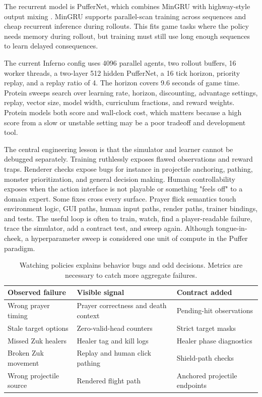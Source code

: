 \documentclass[10pt]{article}
\begin{document}
The recurrent model is PufferNet, which combines MinGRU with highway-style output mixing \cite{mingru, highway}. MinGRU supports parallel-scan training across sequences and cheap recurrent inference during rollouts. This fits game tasks where the policy needs memory during rollout, but training must still use long enough sequences to learn delayed consequences.

The current Inferno config uses 4096 parallel agents, two rollout buffers, 16 worker threads, a two-layer 512 hidden PufferNet, a 16 tick horizon, priority replay, and a replay ratio of 4. The horizon covers 9.6 seconds of game time. Protein sweeps search over learning rate, horizon, discounting, advantage settings, replay, vector size, model width, curriculum fractions, and reward weights. Protein models both score and wall-clock cost, which matters because a high score from a slow or unstable setting may be a poor tradeoff and development tool.

The central engineering lesson is that the simulator and learner cannot be debugged separately. Training ruthlessly exposes flawed observations and reward traps. Renderer checks expose bugs for instance in projectile anchoring, pathing, monster prioritization, and general decision making. Human controllability exposes when the action interface is not playable or something "feels off" to a domain expert. Some fixes cross every surface. Prayer flick semantics \cite{osrs-prayer} touch environment logic, GUI paths, human input paths, render paths, trainer bindings, and tests. The useful loop is often to train, watch, find a player-readable failure, trace the simulator, add a contract test, and sweep again. Although tongue-in-cheek, a hyperparameter sweep is considered one unit of compute in the Puffer paradigm.

\begin{table}[H]
\centering
\small
\begin{tabular}{lll}
\toprule
Observed failure & Visible signal & Contract added \\
\midrule
Wrong prayer timing & Prayer correctness and death context & Pending-hit observations \\
Stale target options & Zero-valid-head counters & Strict target masks \\
Missed Zuk healers & Healer tag and kill logs & Healer phase diagnostics \\
Broken Zuk movement & Replay and human click pathing & Shield-path checks \\
Wrong projectile source & Rendered flight path & Anchored projectile endpoints \\
\bottomrule
\end{tabular}
\caption{Watching policies explains behavior bugs and odd decisions. Metrics are necessary to catch more aggregate failures.}
\label{tab:failures}
\end{table}
\end{document}
